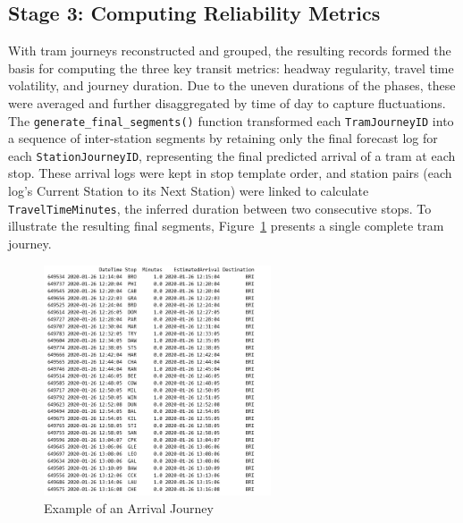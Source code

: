\subsection*{Stage 3: Computing Reliability Metrics}

    With tram journeys reconstructed and grouped, the resulting records formed the basis for computing the three key transit metrics: headway regularity, travel time volatility, and journey duration. Due to the uneven durations of the phases, these were averaged and further disaggregated by time of day to capture fluctuations. The \texttt{generate\allowbreak\_final\allowbreak\_segments()} function transformed each \texttt{TramJourneyID} into a sequence of inter-station segments by retaining only the final forecast log for each \texttt{StationJourneyID}, representing the final predicted arrival of a tram at each stop. These arrival logs were kept in stop template order, and station pairs (each log’s Current Station to its Next Station) were linked to calculate \texttt{TravelTimeMinutes}, the inferred duration between two consecutive stops. To illustrate the resulting final segments, Figure~\ref{fig:arrival_journey} presents a single complete tram journey.

\begin{figure}[H]
  \centering
  \includegraphics[width=0.6\textwidth]{figures/paper_figures/arrival_journey.png}
  \caption{Example of an Arrival Journey}
  \label{fig:arrival_journey}
\end{figure}

